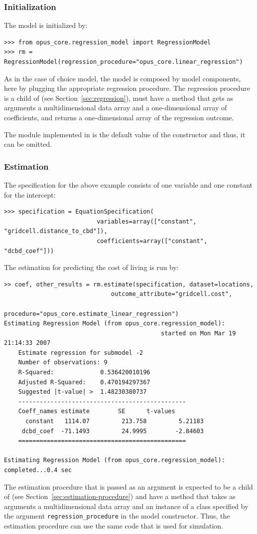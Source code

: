 %
\subsubsection{Initialization}
%
The model is initialized by:
\begin{verbatim}
>>> from opus_core.regression_model import RegressionModel
>>> rm = RegressionModel(regression_procedure="opus_core.linear_regression")
\end{verbatim}
As in the case of choice model, the model is composed by model components, here
by plugging the appropriate regression procedure. The
regression procedure is a child of  (see Section~\ref{sec:regression}),
must have a method  that gets as arguments a
multidimensional data array and a one-dimensional array of coefficients, \coefficientsindex and
returns a one-dimensional array of the regression outcome.

The  module implemented in  is the default
value of the  constructor and thus, it can be omitted.

%
\subsubsection{Estimation}
%
The specification for the above example consists of one variable \variablesindex and one
constant for the intercept:
\variablesindex
\begin{verbatim}
>>> specification = EquationSpecification(
                          variables=array(["constant", "gridcell.distance_to_cbd"]),
                          coefficients=array(["constant", "dcbd_coef"]))
\end{verbatim}
The estimation for predicting the cost of living is run by:
\begin{verbatim}
>> coef, other_results = rm.estimate(specification, dataset=locations,
                              outcome_attribute="gridcell.cost",
                              procedure="opus_core.estimate_linear_regression")
Estimating Regression Model (from opus_core.regression_model):
                                            started on Mon Mar 19 21:14:33 2007
    Estimate regression for submodel -2
    Number of observations: 9
    R-Squared:             0.536420010196
    Adjusted R-Squared:    0.470194297367
    Suggested |t-value| >  1.48230380737
    -----------------------------------------------
    Coeff_names estimate        SE      t-values
      constant   1114.07         213.758         5.21183
     dcbd_coef  -71.1493         24.9995        -2.84603
    ===============================================

Estimating Regression Model (from opus_core.regression_model): completed...0.4 sec
\end{verbatim}
The estimation procedure that is passed as an argument is expected to be
a child of  (see Section~\ref{sec:estimation-procedure}) and have a
method  that takes as arguments a
multidimensional data array and an instance of a class specified by the
argument \verb|regression_procedure| in the model constructor. Thus, the
estimation procedure can use the same code that is used for simulation.

